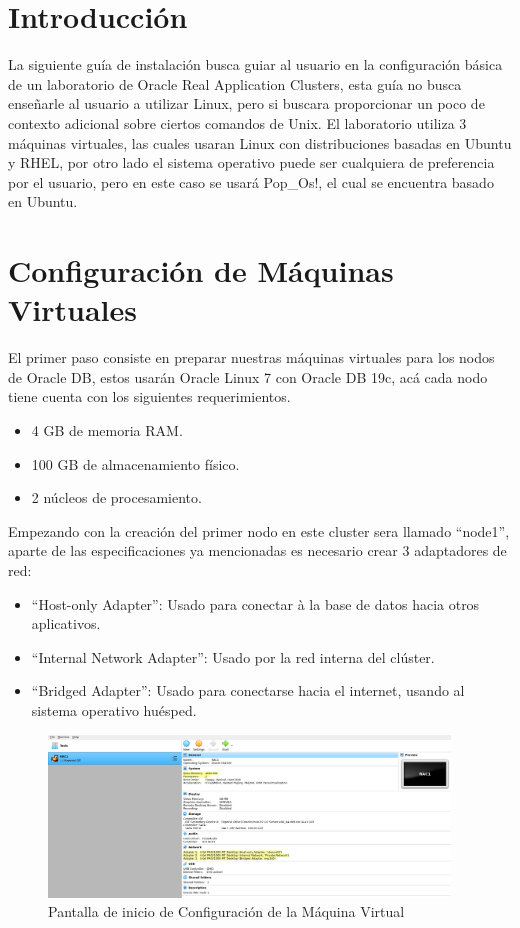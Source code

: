 \documentclass{article}
\begin{document}
\section{Introducción}

La siguiente guía de instalación busca guiar al usuario en la configuración básica de un laboratorio de Oracle Real Application Clusters, esta guía no busca enseñarle al usuario a utilizar Linux, pero si buscara proporcionar un poco de contexto adicional sobre ciertos comandos de Unix. El laboratorio utiliza 3 máquinas virtuales, las cuales usaran Linux con distribuciones basadas en Ubuntu y RHEL, por otro lado el sistema operativo puede ser cualquiera de preferencia por el usuario, pero en este caso se usará Pop\_Os!, el cual se encuentra basado en Ubuntu.

\section{Configuración de Máquinas Virtuales}

El primer paso consiste en preparar nuestras máquinas virtuales para los nodos de Oracle DB, estos usarán Oracle Linux 7 con Oracle DB 19c, acá cada nodo tiene cuenta con los siguientes requerimientos.

\begin{itemize}
	\item 4 GB de memoria RAM.
	\item 100 GB de almacenamiento físico.
	\item 2 núcleos de procesamiento.
\end{itemize}

Empezando con la creación del primer nodo en este cluster sera llamado ``node1'', aparte de las especificaciones ya mencionadas es necesario crear 3 adaptadores de red:

\begin{itemize}
	\item ``Host-only Adapter'': Usado para conectar à la base de datos hacia otros aplicativos.
	\item ``Internal Network Adapter'': Usado por la red interna del clúster.
	\item ``Bridged Adapter'': Usado para conectarse hacia el internet, usando al sistema operativo huésped.
\end{itemize}

\begin{figure}[H]
	\begin{center}
		\includegraphics[width=0.95\textwidth]{vm_base.png}
	\end{center}
	\caption{Pantalla de inicio de Configuración de la Máquina Virtual}
\end{figure}
\end{document}
